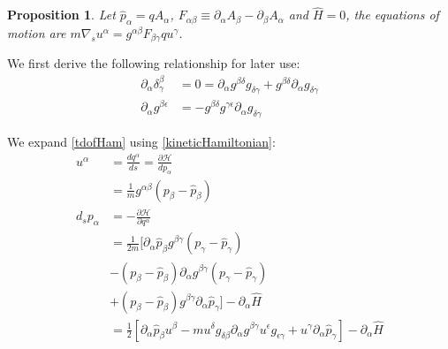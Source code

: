 \documentclass[aps,pra,10pt,twocolumn,floatfix,nofootinbib]{revtex4-1}
\newtheorem{prop}[thm]{Proposition}
\theoremstyle{definition}
\begin{document}
\begin{prop}\label{kineticLaw}
Let $\hat{p}_\alpha = q A_\alpha$, $F_{\alpha \beta} \equiv \partial_\alpha A_\beta - \partial_\beta A_\alpha$ and $\hat{H} = 0$, the equations of motion are $m \nabla_s u^\alpha = g^{\alpha\beta} F_{\beta \gamma} q u^\gamma$.
\end{prop}

We first derive the following relationship for later use:
\begin{align*}
\partial_\alpha \delta^\beta_\gamma &= 0 = \partial_\alpha g^{\beta\delta} g_{\delta\gamma} + g^{\beta\delta} \partial_\alpha g_{\delta\gamma}\\
\partial_\alpha g^{\beta\epsilon} &= - g^{\beta\delta} g^{\gamma\epsilon} \partial_\alpha g_{\delta\gamma}
\end{align*}

We expand \ref{tdofHam} using \ref{kineticHamiltonian}:
\begin{align*}
u^\alpha &= \frac{dq^\alpha}{ds} = \frac{\partial \mathcal{H}}{dp_\alpha} \\
&= \frac{1}{m}g^{\alpha\beta}(p_\beta-\hat{p}_\beta) \\
d_s p_\alpha &= - \frac{\partial \mathcal{H}}{\partial q^\alpha} \\
&=\frac{1}{2m}[\partial_\alpha \hat{p}_\beta g^{\beta \gamma} (p_\gamma -\hat{p}_\gamma) \\
 &- (p_\beta -\hat{p}_\beta) \partial_\alpha g^{\beta \gamma} (p_\gamma -\hat{p}_\gamma) \\
 &+ (p_\beta -\hat{p}_\beta) g^{\beta \gamma} \partial_\alpha \hat{p}_\gamma ]- \partial_\alpha \hat{H} \\
&=\frac{1}{2}[\partial_\alpha \hat{p}_\beta u^\beta
- m u^\delta g_{\delta\beta} \partial_\alpha g^{\beta \gamma} u^\epsilon g_{\epsilon\gamma}
+ u^\gamma \partial_\alpha \hat{p}_\gamma ]- \partial_\alpha \hat{H}
\end{align*}
\end{document}

